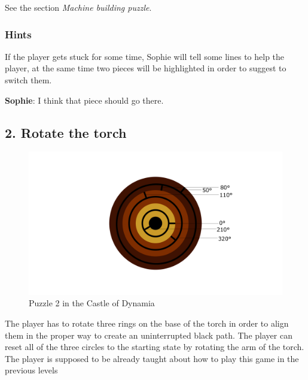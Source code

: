 
%

See the section \textit{Machine building puzzle}.

\subsubsection*{Hints}
If the player gets stuck for some time, Sophie will tell some lines to help the player, at the same time two pieces will be highlighted in order to suggest to switch them.

\textbf{Sophie}: I think that piece should go there.

\subsection{2. Rotate the torch}

\begin{figure}[H]
  \centering
  \includegraphics[width=\textwidth]{Images/Puzzles/torchPuzzleStart}
  \caption{Puzzle 2 in the Castle of Dynamia}
\end{figure}

The player has to rotate three rings on the base of the torch in order to align them in the proper way to create an uninterrupted black path. The player can reset all of the three circles to the starting state by rotating the arm of the torch. The player is supposed to be already taught about how to play this game in the previous levels

